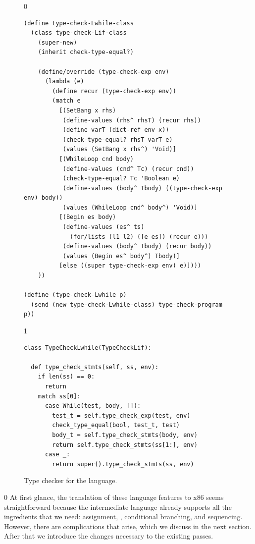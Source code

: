 \documentclass[7x10]{TimesAPriori_MIT}%
\def\racketEd{0}
\def\pythonEd{1}
\def\edition{0}
\numberwithin{theorem}{chapter}
\numberwithin{definition}{chapter}
\numberwithin{equation}{chapter}
\begin{document}
\begin{figure}[tbp]
\begin{tcolorbox}[colback=white]  
{\if\edition\racketEd    
\begin{lstlisting}[basicstyle=\ttfamily\footnotesize]
(define type-check-Lwhile-class
  (class type-check-Lif-class
    (super-new)
    (inherit check-type-equal?)

    (define/override (type-check-exp env)
      (lambda (e)
        (define recur (type-check-exp env))
        (match e
          [(SetBang x rhs)
           (define-values (rhs^ rhsT) (recur rhs))
           (define varT (dict-ref env x))
           (check-type-equal? rhsT varT e)
           (values (SetBang x rhs^) 'Void)]
          [(WhileLoop cnd body)
           (define-values (cnd^ Tc) (recur cnd))
           (check-type-equal? Tc 'Boolean e)
           (define-values (body^ Tbody) ((type-check-exp env) body))
           (values (WhileLoop cnd^ body^) 'Void)]
          [(Begin es body)
           (define-values (es^ ts)
             (for/lists (l1 l2) ([e es]) (recur e)))
           (define-values (body^ Tbody) (recur body))
           (values (Begin es^ body^) Tbody)]
          [else ((super type-check-exp env) e)])))
    ))

(define (type-check-Lwhile p)
  (send (new type-check-Lwhile-class) type-check-program p))
\end{lstlisting}
\fi}
{\if\edition\pythonEd
\begin{lstlisting}
class TypeCheckLwhile(TypeCheckLif):

  def type_check_stmts(self, ss, env):
    if len(ss) == 0:
      return
    match ss[0]:
      case While(test, body, []):
        test_t = self.type_check_exp(test, env)
        check_type_equal(bool, test_t, test)
        body_t = self.type_check_stmts(body, env)
        return self.type_check_stmts(ss[1:], env)
      case _:
        return super().type_check_stmts(ss, env)
\end{lstlisting}
\fi}
\end{tcolorbox}

\caption{Type checker for the \LangLoop{} language.}
\label{fig:type-check-Lwhile}
\end{figure}


{\if\edition\racketEd    
%  
At first glance, the translation of these language features to x86
seems straightforward because the \LangCIf{} intermediate language
already supports all the ingredients that we need: assignment,
, conditional branching, and sequencing. However, there are
complications that arise, which we discuss in the next section. After
that we introduce the changes necessary to the existing passes.
%
\fi}
\end{document}
